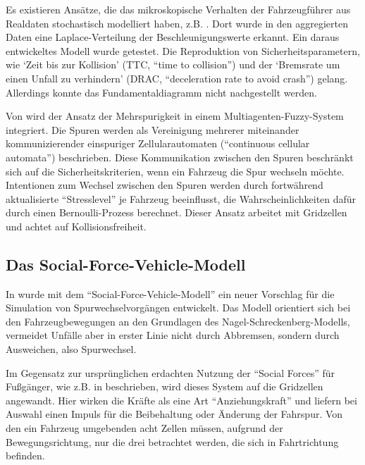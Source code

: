 Es existieren Ansätze, die das mikroskopische Verhalten der Fahrzeugführer aus Realdaten  stochastisch modelliert haben, z.B. \cite{stoch-carfollow}. 
Dort wurde in den aggregierten Daten eine Laplace-Verteilung der Beschleunigungswerte erkannt. 
Ein daraus entwickeltes Modell wurde getestet. 
Die Reproduktion von Sicherheitsparametern, wie \enquote*{Zeit bis zur Kollision} (TTC, \enquote{time to collision}) und der \enquote*{Bremsrate um einen Unfall zu verhindern} (DRAC, \enquote{deceleration rate to avoid crash}) gelang. 
Allerdings konnte das Fundamentaldiagramm nicht nachgestellt werden.

Von \cite{multi-fuzzy} wird der Ansatz der Mehrspurigkeit in einem Multiagenten-Fuzzy-System integriert.
Die Spuren werden als Vereinigung mehrerer miteinander kommunizierender einspuriger Zellularautomaten (\enquote{continuous cellular automata}) beschrieben. 
Diese Kommunikation zwischen den Spuren beschränkt sich auf die Sicherheitskriterien, wenn ein Fahrzeug die Spur wechseln möchte. 
Intentionen zum Wechsel zwischen den Spuren werden durch fortwährend aktualisierte \enquote{Stresslevel} je Fahrzeug beeinflusst, die Wahrscheinlichkeiten dafür durch einen Bernoulli-Prozess berechnet.
Dieser Ansatz arbeitet mit Gridzellen und achtet auf Kollisionsfreiheit.






\subsection{Das Social-Force-Vehicle-Modell}
\label{sec:social-force-vm}

In \cite{dat-ba} wurde mit dem \enquote{Social-Force-Vehicle-Modell} ein neuer Vorschlag für die Simulation von Spurwechselvorgängen entwickelt. 
Das Modell orientiert sich bei den Fahrzeugbewegungen an den Grundlagen des Nagel-Schreckenberg-Modells, vermeidet Unfälle aber in erster Linie nicht durch Abbremsen, sondern durch Ausweichen, also Spurwechsel. 

Im Gegensatz zur ursprünglichen erdachten Nutzung der \enquote{Social Forces} für Fußgänger, wie z.B. in \cite{soc-for} beschrieben, wird dieses System auf die Gridzellen angewandt. 
Hier wirken die Kräfte als eine Art \enquote{Anziehungskraft} und liefern bei Auswahl einen Impuls für die Beibehaltung oder Änderung der Fahrspur. 
Von den ein Fahrzeug umgebenden acht Zellen müssen, aufgrund der Bewegungsrichtung, nur die drei betrachtet werden, die sich in Fahrtrichtung befinden.

